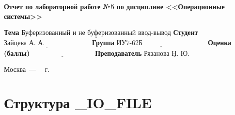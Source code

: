\documentclass[12pt]{report}
\begin{document}
\begin{titlepage}
		\begin{center}
			\noindent\begin{minipage}{1.1\textwidth}\centering
				\Large\textbf{  Отчет по лабораторной работе №5}\newline
				\textbf{по дисциплине <<Операционные системы>>}\newline\newline
			\end{minipage}
		\end{center}
		
		\noindent\textbf{Тема} $\underline{\text{Буферизованный и не буферизованный ввод-вывод}}$\newline\newline
		\noindent\textbf{Студент} $\underline{\text{Зайцева А. А.~~~~~~~~~~~~~~~~~~~~}}$\newline\newline
		\noindent\textbf{Группа} $\underline{\text{ИУ7-62Б~~~~~~~~~~~~~~~~~~~~~~~~~~~~}}$\newline\newline
		\noindent\textbf{Оценка (баллы)} $\underline{\text{~~~~~~~~~~~~~~~~~~~~~~~~~~~}}$\newline\newline
		\noindent\textbf{Преподаватель} $\underline{\text{Рязанова Н. Ю.~~~~~~~}}$\newline
		
		\begin{center}
			\vfill
			Москва~---~\the\year
			~г.
		\end{center}
	\end{titlepage}


\chapter*{Структура \_IO\_FILE}
\end{document}
